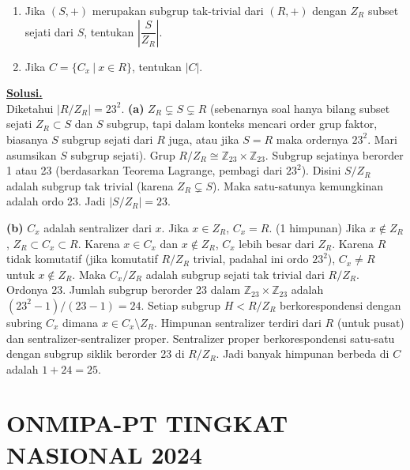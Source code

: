 \documentclass[12pt,twoside]{article}
\newenvironment{solution}
{
	\par\noindent\textbf{\underline{Solusi.}}\\
}
{
	\par
}
\begin{document}
\begin{enumerate}
\begin{enumerate}
          \item Jika $(S,+)$ merupakan subgrup tak-trivial dari $(R,+)$ dengan $Z_R$ subset sejati dari $S$, tentukan $\left|\dfrac{S}{Z_R}\right|$.
          \item Jika $C=\{C_x~|~x\in R\}$, tentukan $|C|$.
        \end{enumerate}
        \begin{solution}
          Diketahui $|R/Z_R| = 23^2$.
          \textbf{(a)} $Z_R \subsetneq S \subsetneq R$ (sebenarnya soal hanya bilang subset sejati $Z_R \subset S$ dan $S$ subgrup, tapi dalam konteks mencari order grup faktor, biasanya $S$ subgrup sejati dari $R$ juga, atau jika $S=R$ maka ordernya $23^2$. Mari asumsikan $S$ subgrup sejati).
          Grup $R/Z_R \cong \mathbb{Z}_{23} \times \mathbb{Z}_{23}$.
          Subgrup sejatinya berorder 1 atau 23 (berdasarkan Teorema Lagrange, pembagi dari $23^2$).
          Disini $S/Z_R$ adalah subgrup tak trivial (karena $Z_R \subsetneq S$).
          Maka satu-satunya kemungkinan adalah ordo 23.
          Jadi $|S/Z_R| = 23$.

          \textbf{(b)} $C_x$ adalah sentralizer dari $x$.
          Jika $x \in Z_R$, $C_x = R$. (1 himpunan)
          Jika $x \notin Z_R$, $Z_R \subset C_x \subset R$. Karena $x \in C_x$ dan $x \notin Z_R$, $C_x$ lebih besar dari $Z_R$.
          Karena $R$ tidak komutatif (jika komutatif $R/Z_R$ trivial, padahal ini ordo $23^2$), $C_x \neq R$ untuk $x \notin Z_R$.
          Maka $C_x/Z_R$ adalah subgrup sejati tak trivial dari $R/Z_R$. Ordonya 23.
          Jumlah subgrup berorder 23 dalam $\mathbb{Z}_{23} \times \mathbb{Z}_{23}$ adalah $(23^2-1)/(23-1) = 24$.
          Setiap subgrup $H < R/Z_R$ berkorespondensi dengan subring $C_x$ dimana $x \in C_x \setminus Z_R$.
          Himpunan sentralizer terdiri dari $R$ (untuk pusat) dan sentralizer-sentralizer proper.
          Sentralizer proper berkorespondensi satu-satu dengan subgrup siklik berorder 23 di $R/Z_R$.
          Jadi banyak himpunan berbeda di $C$ adalah $1 + 24 = 25$.
        \end{solution}
\end{enumerate}
\pagebreak

\section{ONMIPA-PT TINGKAT NASIONAL 2024}
\end{document}
